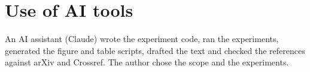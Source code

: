 \section*{Use of AI tools}
An AI assistant (Claude) wrote the experiment code, ran the experiments, generated the figure and
table scripts, drafted the text and checked the references against arXiv and Crossref. The
author chose the scope and the experiments.
